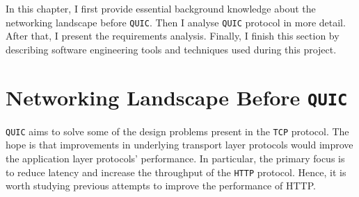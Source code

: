 \documentclass[12pt,a4paper,twoside,openright]{report}
\begin{document}












In this chapter, I first provide essential background knowledge about the networking landscape before \texttt{QUIC}. 
Then I analyse \texttt{QUIC} protocol in more detail.
After that, I present the requirements analysis.
Finally, I finish this section by describing software engineering tools and techniques used during this project.


\section{Networking Landscape Before \texttt{QUIC}}
    \texttt{QUIC} aims to solve some of the design problems present in the \texttt{TCP} protocol. The hope is that improvements in underlying transport layer protocols would improve the application layer protocols' performance.
    In particular, the primary focus is to reduce latency and increase the throughput of the \texttt{HTTP} protocol.
    Hence, it is worth studying previous attempts to improve the performance of HTTP.
\end{document}
